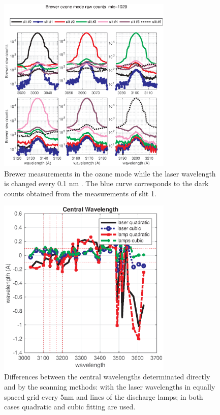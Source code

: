 \documentclass[acp, manuscript]{copernicus}
\begin{document}
%
\begin{figure}[t]
\includegraphics[width=8.3cm]{figures/General_laser_log.eps}
\caption{Brewer measurements in the ozone mode while the laser wavelength is changed every 0.1 nm . The blue curve corresponds to the dark counts obtained from the measurements of slit 1.}
\label{fig:laser_log}
\end{figure}





\begin{figure}[t]
\includegraphics[width=8.3cm]{figures/General_central_comparison.eps}
\caption{Differences between the central wavelengths determinated directly and by the scanning methods: with the laser wavelengths in equally spaced grid every 5\unit{nm} and lines of the discharge lamps; in both cases quadratic and cubic fitting are used.}
\label{fig:cw_comp}
\end{figure}
\end{document}
